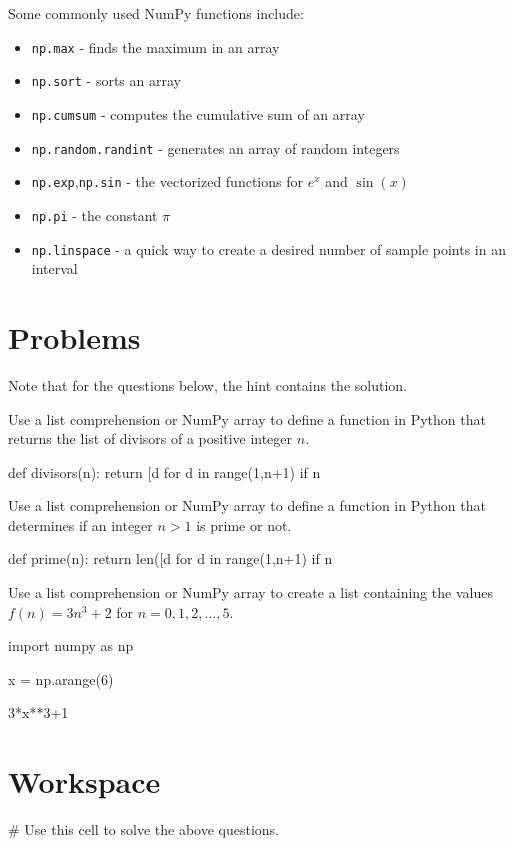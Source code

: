\documentclass{ximera}
\begin{document}
Some commonly used NumPy functions include:

\begin{itemize}
	\item \verb|np.max| - finds the maximum in an array
	\item \verb|np.sort| - sorts an array
	\item \verb|np.cumsum| - computes the cumulative sum of an array
	\item \verb|np.random.randint| - generates an array of random integers
	\item \verb|np.exp|,\verb|np.sin| - the vectorized functions for $e^x$ and $\sin(x)$
	\item \verb|np.pi| - the constant $\pi$
	\item \verb|np.linspace| - a quick way to create a desired number of sample points in an interval
\end{itemize}

\section{Problems}

Note that for the questions below, the hint contains the solution.

\begin{question}
Use a list comprehension or NumPy array to define a function in Python that returns the list of divisors of a positive integer $n$.
	\begin{hint}
\begin{sageCell}
def divisors(n):
        return [d for d in range(1,n+1) if n%
\end{sageCell}
	\end{hint}
\end{question}

\begin{question}
Use a list comprehension or NumPy array to define a function in Python that determines if an integer $n>1$ is prime or not.
	\begin{hint}
\begin{sageCell}
def prime(n):
        return len([d for d in range(1,n+1) if n%
\end{sageCell}
	\end{hint}
\end{question}

\begin{question}
	Use a list comprehension or NumPy array to create a list containing the values $f(n)=3n^3+2$ for $n=0,1,2,\dots,5$.
	\begin{hint}
\begin{sageCell}
import numpy as np

x = np.arange(6)

3*x**3+1
\end{sageCell}
	\end{hint}
\end{question}

\section{Workspace}

\begin{sageCell}
# Use this cell to solve the above questions.
\end{sageCell}
\end{document}
